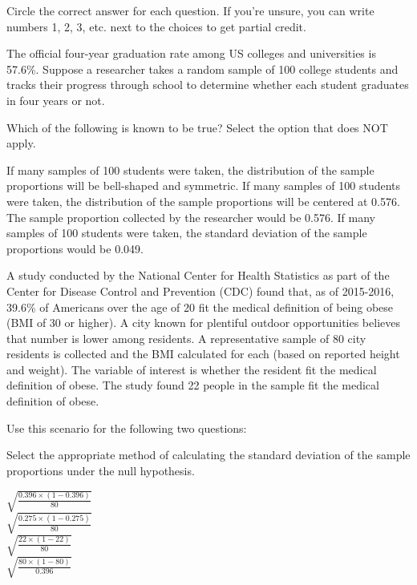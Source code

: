 \documentclass{article}
\begin{document}
	Circle the correct answer for each question.  If you're unsure, you can write numbers 1, 2, 3, etc. next to the choices to get partial credit.\\[.5cm]
	\begin{mcquestions}
		\question The official four-year graduation rate among US colleges and universities is 57.6\%. Suppose a researcher takes a random sample of 100 college students and tracks their progress through school to determine whether each student graduates in four years or not.
		
		Which of the following is known to be true? Select the option that does NOT apply.
		
		\begin{mcanswerslist}
			\answer If many samples of 100 students were taken, the distribution of the sample proportions will be bell-shaped and symmetric.
			\answer If many samples of 100 students were taken, the distribution of the sample proportions will be centered at 0.576.
			\answer[correct] The sample proportion collected by the researcher would be 0.576.
			\answer If many samples of 100 students were taken, the standard deviation of the sample proportions would be 0.049.
		\end{mcanswerslist}
		
		\begin{mcquestioninstruction}
			A study conducted by the National Center for Health Statistics as part of the Center for Disease Control and Prevention (CDC) found that, as of 2015-2016, 39.6\% of Americans over the age of 20 fit the medical definition of being obese (BMI of 30 or higher). A city known for plentiful outdoor opportunities believes that number is lower among residents. A representative sample of 80 city residents is collected and the BMI calculated for each (based on reported height and weight). The variable of interest is whether the resident fit the medical definition of obese. The study found 22 people in the sample fit the medical definition of obese.
			
			Use this scenario for the following two questions:
		\end{mcquestioninstruction}
		
		\question[follow] Select the appropriate method of calculating the standard deviation of the sample proportions under the null hypothesis.
		
		\begin{mcanswerslist}
			\answer[correct] \(\sqrt{\frac{0.396 \times (1-0.396)}{80}}\)\\[0.1cm]
			\answer \(\sqrt{\frac{0.275 \times (1-0.275)}{80}}\)\\[0.1cm]
			\answer \(\sqrt{\frac{22 \times (1-22)}{80}}\)\\[0.1cm]
			\answer \(\sqrt{\frac{80 \times (1-80)}{0.396}}\)\\[0.1cm]
		\end{mcanswerslist}
		

\end{mcquestions}
\end{document}
